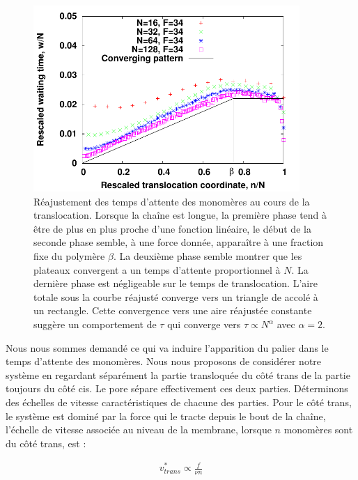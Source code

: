 \begin{figure}[H]
\begin{center}
\includegraphics[width=0.9\textwidth]{waitingtimerescaled.pdf}


\caption[Réajustement des temps d'attente des monomères]{Réajustement des temps d'attente des monomères au cours de la translocation. Lorsque la chaîne est longue, la première phase tend à être de plus en plus proche d'une fonction linéaire, le début de la seconde phase semble, à une force donnée, apparaître à une fraction fixe du polymère $\beta$. La deuxième phase semble montrer que les plateaux convergent a un temps d'attente proportionnel à $N$. La dernière phase est négligeable sur le temps de translocation. L'aire totale sous la courbe réajusté converge vers un triangle de accolé à un rectangle. Cette convergence vers une aire réajustée constante suggère un comportement de $\tau$ qui converge vers $\tau \propto N^{\alpha}$ avec $\alpha=2$.}
\label{waitingtimerescaled}
\end{center}
\end{figure}


Nous nous sommes demandé ce qui va induire l'apparition du palier dans le temps d'attente des monomères. Nous nous proposons de considérer notre système en regardant séparément la partie transloquée du côté trans de la partie toujours du côté cis. Le pore sépare effectivement ces deux parties. Déterminons des échelles de vitesse caractéristiques de chacune des parties. Pour le côté trans, le système est dominé par la force qui le tracte depuis le bout de la chaîne, l'échelle de vitesse associée au niveau de la membrane, lorsque $n$ monomères sont du côté trans, est :

\begin{center}
\begin{eqnarray}
v^*_{trans} \propto \frac{f}{\nu n}
\end{eqnarray}
\end{center}


